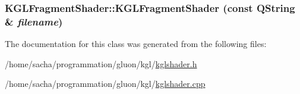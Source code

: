 \hypertarget{class_k_g_l_fragment_shader_63789f9dfc6cfe19d7423ff6540ca53d}{
\subsubsection[{KGLFragmentShader}]{\setlength{\rightskip}{0pt plus 5cm}KGLFragmentShader::KGLFragmentShader (const QString \& {\em filename})}}
\label{class_k_g_l_fragment_shader_63789f9dfc6cfe19d7423ff6540ca53d}




The documentation for this class was generated from the following files:\begin{CompactItemize}
\item 
/home/sacha/programmation/gluon/kgl/\hyperlink{kglshader_8h}{kglshader.h}\item 
/home/sacha/programmation/gluon/kgl/\hyperlink{kglshader_8cpp}{kglshader.cpp}\end{CompactItemize}
